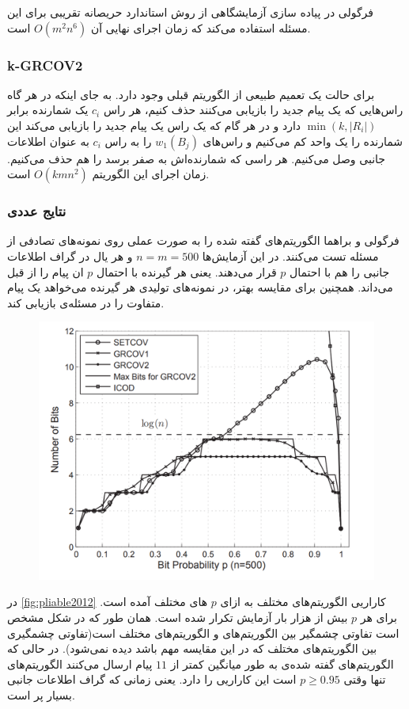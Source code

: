  فرگولی در پیاده سازی آزمایشگاهی از روش استاندارد حریصانه تقریبی برای این مسئله استفاده می‌کند که زمان اجرای نهایی آن
 $O(m^2 n^6)$
 است.
\subsubsection{k-GRCOV2}
برای حالت
\picodt
یک تعمیم طبیعی از الگوریتم قبلی وجود دارد. به جای اینکه در هر گاه راس‌هایی که یک پیام جدید را بازیابی می‌کنند حذف کنیم، هر راس 
$c_i$
یک شمارنده برابر
$\min(k, |R_i|)$
دارد و در هر گام که یک راس یک پیام جدید را بازیابی می‌کند این شمارنده را یک واحد کم می‌کنیم و راس‌های
$w_1(B_j)$
را به راس
$c_i$
به عنوان اطلاعات جانبی وصل می‌کنیم. هر راسی که شمارنده‌اش به صفر برسد را هم حذف می‌کنیم. زمان اجرای این الگوریتم
$O(kmn^2)$
است.

\subsubsection{
نتایج عددی
}
فرگولی و براهما  الگوریتم‌های گفته شده را به صورت عملی روی نمونه‌های تصادفی از مسئله تست می‌کنند. در این آزمایش‌ها 
$n = m = 500$
و هر یال در گراف اطلاعات جانبی را هم با احتمال
$p$
قرار می‌دهند. یعنی هر گیرنده با احتمال
$p$
ان پیام‌ را از قبل می‌داند. همچنین برای مقایسه بهتر، در نمونه‌های تولیدی هر گیرنده می‌خواهد یک پیام متفاوت را در مسئله‌ی
\icod
بازیابی کند.
\begin{figure}
	\centering
	\includegraphics[width=0.7\linewidth]{figs/ch3/pliable2012}
	\caption{\cite{pliablefirstpaper}}
	\label{fig:pliable2012}
\end{figure}

در 
\autoref{fig:pliable2012}
کاراریی الگوریتم‌های مختلف به ازای 
$p$
های مختلف آمده است. برای هر
$p$
بیش از هزار بار آزمایش تکرار شده است. همان طور که در شکل مشخص است تفاوتی چشمگیر بین الگوریتم‌های
\picod
و الگوریتم‌های مختلف
\icod
است(تفاوتی چشمگیری بین الگوریتم‌های مختلف
\icod
که در این مقایسه مهم باشد دیده نمی‌شود). در حالی که الگوریتم‌های گفته شده‌ی
\picod
به طور میانگین کمتر از
$11$
پیام ارسال می‌کنند الگوریتم‌های
\icod
تنها وقتی
$p \geq 0.95$
است این کاراریی را دارد. یعنی زمانی که گراف اطلاعات جانبی بسیار پر است.

